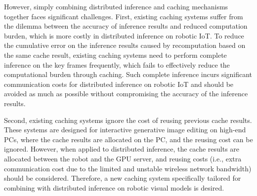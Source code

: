 However, simply combining distributed inference and caching mechanisms together faces significant challenges. 
First, existing caching systems suffer from the dilemma between the accuracy of inference results and reduced computation burden, which is more costly in distributed inference on robotic IoT. 
To reduce the cumulative error on the inference results caused by recomputation based on the same cache result, existing caching systems need to perform complete inference on the key frames frequently, which fails to effectively reduce the computational burden through caching. 
Such complete inference incurs significant communication costs for distributed inference on robotic IoT and should be avoided as much as possible without compromising the accuracy of the inference results.

Second, existing caching systems ignore the cost of reusing previous cache results. 
These systems are designed for interactive generative image editing on high-end PCs, where the cache results are allocated on the PC, and the reusing cost can be ignored. 
However, when applied to distributed inference, the cache results are allocated between the robot and the GPU server, and reusing costs (i.e., extra communication cost due to the limited and unstable wireless network bandwidth) should be considered. 
Therefore, a new caching system specifically tailored for combining with distributed inference on robotic visual models is desired.





